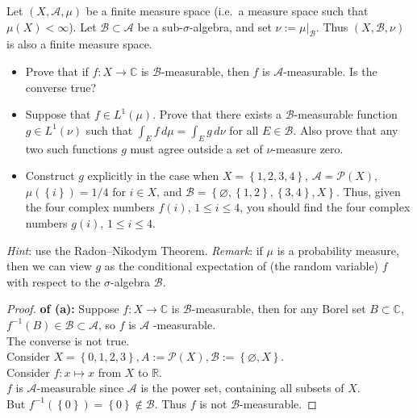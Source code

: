 Let \((X,\mathcal{A},\mu)\) be a finite measure space (i.e.~a measure space such that \(\mu(X) < \infty\)). Let \(\mathcal{B} \subset \mathcal{A}\) be a sub-\(\sigma\)-algebra, and set \(\nu := \mu|_{\mathcal{B}}\). Thus \((X,\mathcal{B},\nu)\) is also a finite measure space.

\begin{itemize}
\item
  Prove that if \(f:X\rightarrow\mathbb{C}\) is \(\mathcal{B}\)-measurable, then \(f\) is \(\mathcal{A}\)-measurable. Is the converse true?
\item
  Suppose that \(f \in L^{1}(\mu)\). Prove that there exists a \(\mathcal{B}\)-measurable function \(g \in L^{1}(\nu)\) such that \(\int_{E}f\, d\mu = \int_{E}g\, d\nu\) for all \(E \in \mathcal{B}\). Also prove that any two such functions \(g\) must agree outside a set of \(\nu\)-measure zero.
\item
  Construct \(g\) explicitly in the case when \(X = \left\{ {1,2,3,4} \right\}\), \(\mathcal{A} = \mathcal{P}(X)\), \(\mu(\left\{ i \right\}) = 1/4\) for \(i \in X\), and \(\mathcal{B} = \left\{ {\varnothing,\left\{ {1,2} \right\},\left\{ {3,4} \right\},X} \right\}\). Thus, given the four complex numbers \(f(i)\), \(1 \leq i \leq 4\), you should find the four complex numbers \(g(i)\), \(1 \leq i \leq 4\).
\end{itemize}

\emph{Hint}: use the Radon--Nikodym Theorem. \emph{Remark}: if \(\mu\) is a probability measure, then we can view \(g\) as the conditional expectation of (the random variable) \(f\) with respect to the \(\sigma\)-algebra \(\mathcal{B}\).

\begin{proof}

\textbf{of (a):} Suppose \(f:X\rightarrow\mathbb{C}\) is \(\mathcal{B}\)-measurable, then for any Borel set \(B \subset \mathbb{C}\), \(f^{- 1}(B) \in \mathcal{B} \subset \mathcal{A}\), so \(f\) is \(\mathcal{A}\) -measurable.\\
The converse is not true.\\
Consider \(X = \left\{ {0,1,2,3} \right\},A := \mathcal{P}(X),\mathcal{B} := \left\{ {\varnothing,X} \right\}\).\\
Consider \(f:x\mapsto x\) from \(X\) to \(\mathbb{R}\).\\
\(f\) is \(\mathcal{A}\)-measurable since \(\mathcal{A}\) is the power set, containing all subsets of \(X\).\\
But \(f^{- 1}(\left\{ 0 \right\}) = \left\{ 0 \right\} \notin \mathcal{B}\). Thus \(f\) is not \(\mathcal{B}\)-measurable.

\end{proof}

